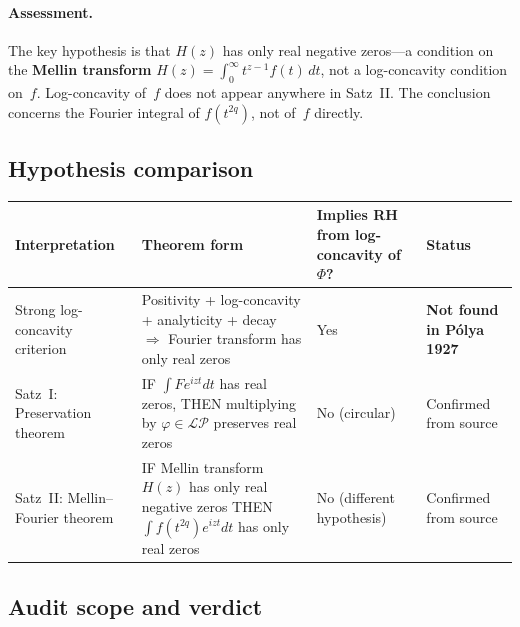 \documentclass[11pt]{article}
\theoremstyle{definition}
\theoremstyle{remark}
\begin{document}
\paragraph{Assessment.}
The key hypothesis is that $H(z)$ has only real negative zeros---a condition on the
\textbf{Mellin transform} $H(z)=\int_0^\infty t^{z-1}f(t)\,dt$, not a log-concavity
condition on~$f$.
Log-concavity of~$f$ does not appear anywhere in Satz~II.
The conclusion concerns the Fourier integral of $f(t^{2q})$, not of~$f$ directly.

\subsection{Hypothesis comparison}\label{sec:interp_table}

\begin{center}\small
\begin{tabular}{@{}p{3.0cm}p{4.8cm}p{2.5cm}p{2.0cm}@{}}
\toprule
Interpretation & Theorem form &
Implies RH from log-concavity of~$\Phi$? & Status \\
\midrule
Strong log-concavity criterion &
  Positivity + log-concavity + analyticity + decay $\Rightarrow$
  Fourier transform has only real zeros &
  Yes & \textbf{Not found in P\'{o}lya 1927} \\[6pt]
Satz~I: Preservation theorem &
  IF $\int Fe^{izt}dt$ has real zeros, THEN multiplying by $\varphi\in\mathcal{LP}$
  preserves real zeros &
  No (circular) & Confirmed from source \\[6pt]
Satz~II: Mellin--Fourier theorem &
  IF Mellin transform $H(z)$ has only real negative zeros THEN
  $\int f(t^{2q})e^{izt}dt$ has only real zeros &
  No (different hypothesis) & Confirmed from source \\
\bottomrule
\end{tabular}
\end{center}

\subsection{Audit scope and verdict}\label{sec:verdict}
\end{document}
